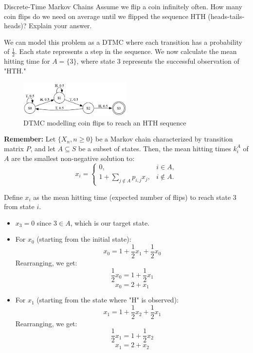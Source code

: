 \begin{problem}{Discrete-Time Markov Chains}
Assume we flip a coin infinitely often. How many coin flips do we need on average until we flipped the sequence HTH (heads-tails-heads)? Explain your answer.
\end{problem}

\begin{solution}
  We can model this problem as a DTMC where each transition has a probability of $\frac{1}{2}$. Each state represents a step in the sequence. We now calculate the mean hitting time for $A = \{3\}$, where state 3 represents the successful observation of "HTH."

  \begin{figure}[h!]
    \begin{center}
      \includegraphics[width=0.5\textwidth]{img/23.2.png}
    \end{center}
    \caption{DTMC modelling coin flips to reach an HTH sequence}
  \end{figure}

  \textbf{Remember:} Let $\{X_n, n \geq 0\}$ be a Markov chain characterized by transition matrix $P$, and let $A \subseteq S$ be a subset of states. Then, the mean hitting times $k^A_i$ of $A$ are the smallest non-negative solution to:
  \[
    x_i =
    \begin{cases}
      0, & i \in A, \\
      1 + \sum_{j \notin A} p_{i,j} x_j, & i \notin A.
    \end{cases}
  \]

  Define \( x_i \) as the mean hitting time (expected number of flips) to reach state 3 from state \( i \).

  \begin{itemize}
    \item $x_3 = 0$ since $3 \in A$, which is our target state.
    \item For $x_0$ (starting from the initial state):
      \[
        x_0 = 1 + \frac{1}{2}x_1 + \frac{1}{2}x_0
      \]
      Rearranging, we get:
      \[
        \frac{1}{2}x_0 = 1 + \frac{1}{2}x_1
      \]
      \[
        x_0 = 2 + x_1
      \]

    \item For $x_1$ (starting from the state where "H" is observed):
      \[
        x_1 = 1 + \frac{1}{2}x_2 + \frac{1}{2}x_1
      \]
      Rearranging, we get:
      \[
        \frac{1}{2}x_1 = 1 + \frac{1}{2}x_2
      \]
      \[
        x_1 = 2 + x_2
      \]


\end{itemize}
\end{solution}

